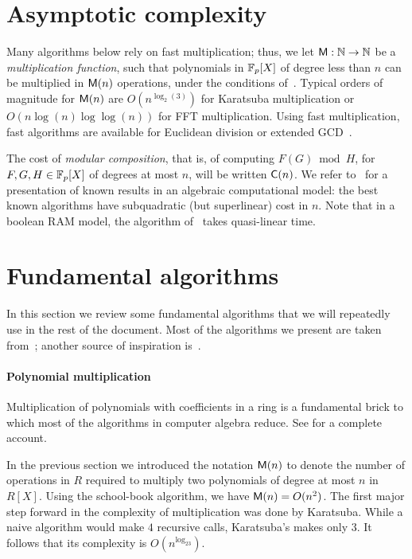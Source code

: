 \section{Asymptotic complexity}
\label{sec:asympt-compl}
Many algorithms below rely on fast multiplication; thus, we let $\mathsf{M}
: \mathbb{N} \rightarrow \mathbb{N}$ be a {\em multiplication function}, such that
polynomials in $\mathbb{F}_p[X]$ of degree less than $n$ can be multiplied in
$\mathsf{M}(n)$ operations, under the conditions of~\cite[Ch.~8.3]{vzGG}.
Typical orders of magnitude for $\mathsf{M}(n)$ are $O(n^{\log_2(3)})$ for
Karatsuba multiplication or $O(n\log (n) \log\log (n))$ for FFT
multiplication. Using fast multiplication, fast algorithms are
available for Euclidean division or extended GCD~\cite[Chapter~9 \&
11]{vzGG}.

The cost of {\em modular composition}, that is, of computing $F(G)
\bmod H$, for $F,G,H\in\mathbb{F}_p[X]$ of degrees at most $n$, will be
written $\mathsf{C}(n)$. We refer to~\cite[Chapter~12]{vzGG} for a
presentation of known results in an algebraic computational model: the
best known algorithms have subquadratic (but superlinear) cost in
$n$. Note that in a boolean RAM model, the algorithm of~\cite{KeUm08}
takes quasi-linear time.

\section{Fundamental algorithms}
\label{sec:fund-algor}
In this section we review some fundamental algorithms that we will
repeatedly use in the rest of the document. Most of the algorithms we
present are taken from~\cite{vzGG}; another source of inspiration
is~\cite{todo}.

\paragraph{Polynomial multiplication}
Multiplication of polynomials with coefficients in a ring is a
fundamental brick to which most of the algorithms in computer algebra
reduce. See \cite[Chapter~9]{vzGG} for a complete account.

In the previous section we introduced the notation $\mathsf{M}(n)$ to
denote the number of operations in $R$ required to multiply two
polynomials of degree at most $n$ in $R[X]$.  Using the school-book
algorithm, we have $\mathsf{M}(n) = O(n^2)$. The first major step forward
in the complexity of multiplication was done by Karatsuba.  While a
naive algorithm would make $4$ recursive calls, Karatsuba's makes only
$3$. It follows that its complexity is $O(n^{\log_23})$.


